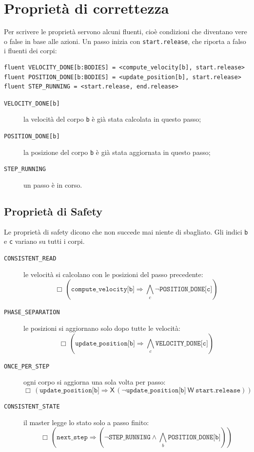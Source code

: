 \section{Proprietà di correttezza}
Per scrivere le proprietà servono alcuni fluenti, cioè condizioni che diventano vere o false in base alle azioni.
Un passo inizia con \texttt{start.release}, che riporta a falso i fluenti dei corpi:
\begin{lstlisting}[style=fsp, basicstyle=\ttfamily\footnotesize]
fluent VELOCITY_DONE[b:BODIES] = <compute_velocity[b], start.release>
fluent POSITION_DONE[b:BODIES] = <update_position[b], start.release>
fluent STEP_RUNNING = <start.release, end.release>
\end{lstlisting}
\begin{description}
  \item[\texttt{VELOCITY\_DONE[b]}] la velocità del corpo \texttt{b} è già stata calcolata in questo passo;
  \item[\texttt{POSITION\_DONE[b]}] la posizione del corpo \texttt{b} è già stata aggiornata in questo passo;
  \item[\texttt{STEP\_RUNNING}] un passo è in corso.
\end{description}

\subsection{Proprietà di Safety}
Le proprietà di safety dicono che non succede mai niente di sbagliato.
Gli indici \texttt{b} e \texttt{c} variano su tutti i corpi.
\begin{description}
  \item[\texttt{CONSISTENT\_READ}] le velocità si calcolano con le posizioni del passo precedente:
    \[\Box\,(\texttt{compute\_velocity[b]} \Rightarrow \textstyle\bigwedge_{c} \neg\texttt{POSITION\_DONE[c]})\]
  \item[\texttt{PHASE\_SEPARATION}] le posizioni si aggiornano solo dopo tutte le velocità:
    \[\Box\,(\texttt{update\_position[b]} \Rightarrow \textstyle\bigwedge_{c} \texttt{VELOCITY\_DONE[c]})\]
  \item[\texttt{ONCE\_PER\_STEP}] ogni corpo si aggiorna una sola volta per passo:
    \[\Box\,(\texttt{update\_position[b]} \Rightarrow \mathsf{X}\,(\neg\texttt{update\_position[b]}\ \mathsf{W}\ \texttt{start.release}))\]
  \item[\texttt{CONSISTENT\_STATE}] il master legge lo stato solo a passo finito:
    \[\Box\,(\texttt{next\_step} \Rightarrow (\neg\texttt{STEP\_RUNNING} \land \textstyle\bigwedge_{b} \texttt{POSITION\_DONE[b]}))\]
\end{description}

